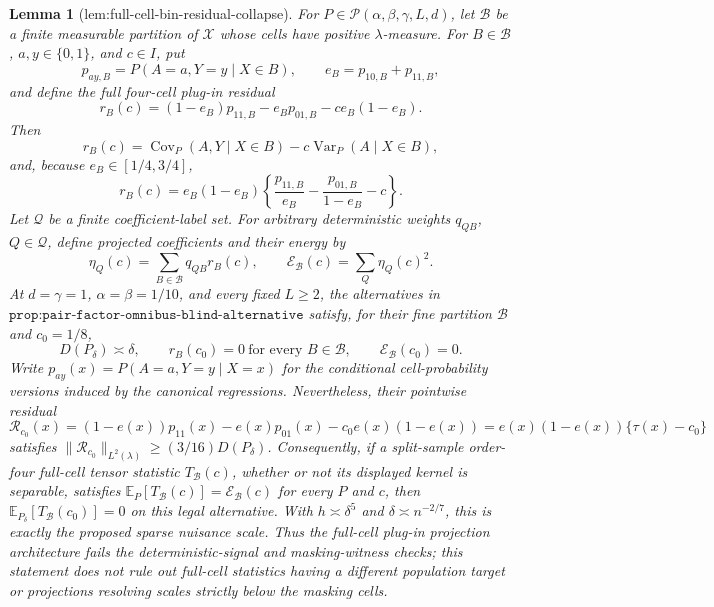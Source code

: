 \documentclass{article}
\newtheorem{lemma}{Lemma}
\begin{document}
\begin{lemma}[lem:full-cell-bin-residual-collapse]\label{lem:full-cell-bin-residual-collapse}
For \(P\in\mathcal P(\alpha,\beta,\gamma,L,d)\), let \(\mathcal B\) be a finite measurable partition of \(\mathcal X\) whose cells have positive \(\lambda\)-measure.  For \(B\in\mathcal B\), \(a,y\in\{0,1\}\), and \(c\in I\), put
\[
 p_{ay,B}=P(A=a,Y=y\mid X\in B),\qquad
 e_B=p_{10,B}+p_{11,B},
\]
and define the full four-cell plug-in residual
\[
 r_B(c)=(1-e_B)p_{11,B}-e_Bp_{01,B}-c e_B(1-e_B).
\]
Then
\[
 r_B(c)=\operatorname{Cov}_P(A,Y\mid X\in B)
          -c\operatorname{Var}_P(A\mid X\in B),                                      \tag{38}
\]
and, because \(e_B\in[1/4,3/4]\),
\[
 r_B(c)=e_B(1-e_B)
 \left\{\frac{p_{11,B}}{e_B}-\frac{p_{01,B}}{1-e_B}-c\right\}.                       \tag{39}
\]
Let \(\mathcal Q\) be a finite coefficient-label set.  For arbitrary deterministic weights \(q_{QB}\), \(Q\in\mathcal Q\), define projected coefficients and their energy by
\[
 \eta_Q(c)=\sum_{B\in\mathcal B}q_{QB}r_B(c),
 \qquad
 \mathcal E_{\mathcal B}(c)=\sum_Q\eta_Q(c)^2.                                       \tag{40}
\]
At \(d=\gamma=1\), \(\alpha=\beta=1/10\), and every fixed \(L\ge2\), the alternatives in \(\texttt{prop:pair-factor-omnibus-blind-alternative}\) satisfy, for their fine partition \(\mathcal B\) and \(c_0=1/8\),
\[
 D(P_\delta)\asymp\delta,
 \qquad r_B(c_0)=0\ \text{for every }B\in\mathcal B,
 \qquad \mathcal E_{\mathcal B}(c_0)=0.                                               \tag{41}
\]
Write \(p_{ay}(x)=P(A=a,Y=y\mid X=x)\) for the conditional cell-probability versions induced by the canonical regressions.  Nevertheless, their pointwise residual
\[
 \mathcal R_{c_0}(x)=(1-e(x))p_{11}(x)-e(x)p_{01}(x)-c_0e(x)(1-e(x))
                    =e(x)(1-e(x))\{\tau(x)-c_0\}
\]
satisfies \(\|\mathcal R_{c_0}\|_{L^2(\lambda)}\ge(3/16)D(P_\delta)\).  Consequently, if a split-sample order-four full-cell tensor statistic \(T_{\mathcal B}(c)\), whether or not its displayed kernel is separable, satisfies \(\mathbb E_P[T_{\mathcal B}(c)]=\mathcal E_{\mathcal B}(c)\) for every \(P\) and \(c\), then \(\mathbb E_{P_\delta}[T_{\mathcal B}(c_0)]=0\) on this legal alternative.  With \(h\asymp\delta^5\) and \(\delta\asymp n^{-2/7}\), this is exactly the proposed sparse nuisance scale.  Thus the full-cell plug-in projection architecture fails the deterministic-signal and masking-witness checks; this statement does not rule out full-cell statistics having a different population target or projections resolving scales strictly below the masking cells.
\end{lemma}
\end{document}
